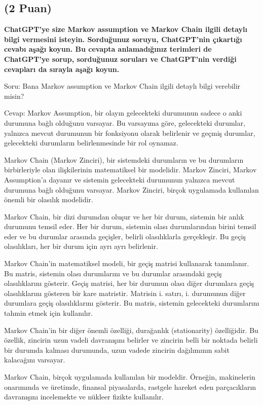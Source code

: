 \documentclass[11pt]{article}
\begin{document}
\subsection{(2 Puan)} \textbf{ChatGPT’ye size Markov assumption ve Markov Chain ilgili detaylı bilgi vermesini isteyin. Sorduğunuz soruyu, ChatGPT'nin çıkartığı cevabı aşağı koyun. Bu cevapta anlamadığınız terimleri de ChatGPT’ye sorup, sorduğunuz soruları ve ChatGPT’nin verdiği cevapları da sırayla aşağı koyun.}

Soru: Bana Markov assumption ve Markov Chain ilgili detaylı bilgi verebilir misin?

Cevap: Markov Assumption, bir olayın gelecekteki durumunun sadece o anki durumuna bağlı olduğunu varsayar. Bu varsayıma göre, gelecekteki durumlar, yalnızca mevcut durumunun bir fonksiyonu olarak belirlenir ve geçmiş durumlar, gelecekteki durumların belirlenmesinde bir rol oynamaz.

Markov Chain (Markov Zinciri), bir sistemdeki durumların ve bu durumların birbirleriyle olan ilişkilerinin matematiksel bir modelidir. Markov Zinciri, Markov Assumption'a dayanır ve sistemin gelecekteki durumunun yalnızca mevcut durumuna bağlı olduğunu varsayar. Markov Zinciri, birçok uygulamada kullanılan önemli bir olasılık modelidir.

Markov Chain, bir dizi durumdan oluşur ve her bir durum, sistemin bir anlık durumunu temsil eder. Her bir durum, sistemin olası durumlarından birini temsil eder ve bu durumlar arasında geçişler, belirli olasılıklarla gerçekleşir. Bu geçiş olasılıkları, her bir durum için ayrı ayrı belirlenir.

Markov Chain'in matematiksel modeli, bir geçiş matrisi kullanarak tanımlanır. Bu matris, sistemin olası durumlarını ve bu durumlar arasındaki geçiş olasılıklarını gösterir. Geçiş matrisi, her bir durumun olası diğer durumlara geçiş olasılıklarını gösteren bir kare matristir. Matrisin i. satırı, i. durumunun diğer durumlara geçiş olasılıklarını gösterir. Bu matris, sistemin gelecekteki durumlarını tahmin etmek için kullanılır.

Markov Chain'in bir diğer önemli özelliği, durağanlık (stationarity) özelliğidir. Bu özellik, zincirin uzun vadeli davranışını belirler ve zincirin belli bir noktada belirli bir durumda kalması durumunda, uzun vadede zincirin dağılımının sabit kalacağını varsayar.

Markov Chain, birçok uygulamada kullanılan bir modeldir. Örneğin, makinelerin onarımında ve üretimde, finansal piyasalarda, rastgele hareket eden parçacıkların davranışını incelemekte ve nükleer fizikte kullanılır.
\end{document}
